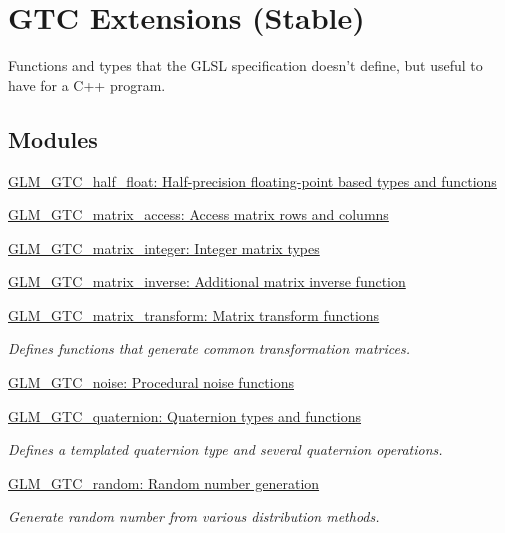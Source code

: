 \hypertarget{group__gtc}{\section{\-G\-T\-C \-Extensions (\-Stable)}
\label{group__gtc}
}


\-Functions and types that the \-G\-L\-S\-L specification doesn't define, but useful to have for a \-C++ program.  


\subsection*{\-Modules}
\begin{DoxyCompactItemize}
\item 
\hyperlink{group__gtc__half__float}{\-G\-L\-M\-\_\-\-G\-T\-C\-\_\-half\-\_\-float\-: Half-\/precision floating-\/point based types and functions}
\item 
\hyperlink{group__gtc__matrix__access}{\-G\-L\-M\-\_\-\-G\-T\-C\-\_\-matrix\-\_\-access\-: Access matrix rows and columns}
\item 
\hyperlink{group__gtc__matrix__integer}{\-G\-L\-M\-\_\-\-G\-T\-C\-\_\-matrix\-\_\-integer\-: Integer matrix types}
\item 
\hyperlink{group__gtc__matrix__inverse}{\-G\-L\-M\-\_\-\-G\-T\-C\-\_\-matrix\-\_\-inverse\-: Additional matrix inverse function}
\item 
\hyperlink{group__gtc__matrix__transform}{\-G\-L\-M\-\_\-\-G\-T\-C\-\_\-matrix\-\_\-transform\-: Matrix transform functions}
\begin{DoxyCompactList}\small\item\em \-Defines functions that generate common transformation matrices. \end{DoxyCompactList}\item 
\hyperlink{group__gtc__noise}{\-G\-L\-M\-\_\-\-G\-T\-C\-\_\-noise\-: Procedural noise functions}
\item 
\hyperlink{group__gtc__quaternion}{\-G\-L\-M\-\_\-\-G\-T\-C\-\_\-quaternion\-: Quaternion types and functions}
\begin{DoxyCompactList}\small\item\em \-Defines a templated quaternion type and several quaternion operations. \end{DoxyCompactList}\item 
\hyperlink{group__gtc__random}{\-G\-L\-M\-\_\-\-G\-T\-C\-\_\-random\-: Random number generation}
\begin{DoxyCompactList}\small\item\em \-Generate random number from various distribution methods. \end{DoxyCompactList}\item 

\end{DoxyCompactItemize}
